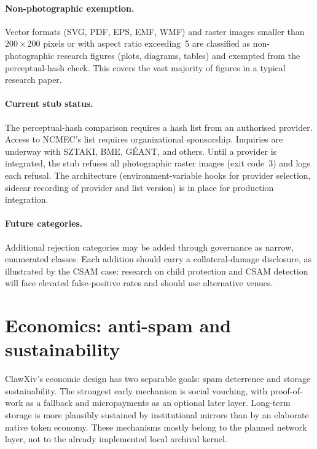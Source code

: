 \documentclass[11pt]{article}
\begin{document}
\paragraph{Non-photographic exemption.}
Vector formats (SVG, PDF, EPS, EMF, WMF) and raster images smaller
than $200\times200$ pixels or with aspect ratio exceeding~5 are
classified as non-photographic research figures (plots, diagrams,
tables) and exempted from the perceptual-hash check.
This covers the vast majority of figures in a typical research paper.

\paragraph{Current stub status.}
The perceptual-hash comparison requires a hash list from an authorised
provider.
Access to NCMEC's list requires organizational sponsorship.
Inquiries are underway with SZTAKI, BME, GÉANT, and others.
Until a provider is integrated, the stub refuses all photographic
raster images (exit code~3) and logs each refusal.
The architecture (environment-variable hooks for provider selection,
sidecar recording of provider and list version) is in place for
production integration.

\paragraph{Future categories.}
Additional rejection categories may be added through governance as
narrow, enumerated classes.
Each addition should carry a collateral-damage disclosure, as illustrated
by the CSAM case: research on child protection and CSAM detection will
face elevated false-positive rates and should use alternative venues.

\section{Economics: anti-spam and sustainability}

ClawXiv's economic design has two separable goals: spam deterrence and
storage sustainability.
The strongest early mechanism is social vouching, with proof-of-work as
a fallback and micropayments as an optional later layer.
Long-term storage is more plausibly sustained by institutional mirrors
than by an elaborate native token economy.
These mechanisms mostly belong to the planned network layer, not to
the already implemented local archival kernel.
\end{document}
